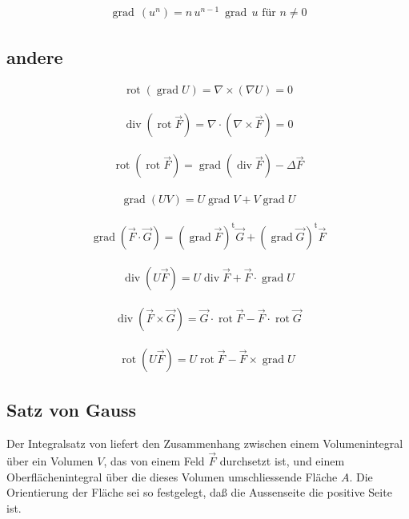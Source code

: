 \documentclass[a4paper]{scrartcl}
\begin{document}
\begin{align}
\label{eqn:ProduktregelEinesGradientMitPotenzen}
\operatorname{grad}\,(u^n) = n\, u^{n-1}\ \operatorname{grad}\,u \text{ für } n\neq 0
\end{align}


\subsection{andere}
\begin{align}
\operatorname{rot}(\operatorname{grad}U)=\nabla \times (\nabla U) = 0
\end{align}

\begin{align}
\operatorname{div}(\operatorname{rot}\vec{F}) = \nabla \cdot (\nabla \times
\vec F) = 0
\end{align}

\begin{align}
\operatorname{rot}(\operatorname{rot}\vec{F}) =
\operatorname{grad}(\operatorname{div}\vec{F}) -\Delta \vec{F}
\end{align}

\begin{align}
\operatorname{grad}(UV)=U\operatorname{grad}V+V\operatorname{grad}U
\end{align}

\begin{align}
\operatorname{grad}(\vec{F}\cdot \vec{G}) =
(\operatorname{grad}\vec{F})^{\operatorname t}\vec{G} + (\operatorname{grad}\vec{G})^{\operatorname t}\vec{F}
\end{align}

\begin{align}
\operatorname{div}(U\vec{F})=U\operatorname{div}\vec{F}+
\vec{F}\cdot\operatorname{grad}U
\end{align}

\begin{align}
\operatorname{div}(\vec{F}\times \vec{G})= \vec{G} \cdot
\operatorname{rot}\vec{F} -\vec{F}\cdot\operatorname{rot}\vec{G}
\end{align}

\begin{align}
\operatorname{rot}(U\vec{F})= U\operatorname{rot}\vec{F}
-\vec{F}\times\operatorname{grad}U\
\end{align}
\subsection{Satz von Gauss}
Der Integralsatz von  liefert den Zusammenhang zwischen einem Volumenintegral
über ein Volumen $V$, das von einem Feld $\vec F$ durchsetzt ist, und einem
Oberflächenintegral über die dieses Volumen umschliessende Fläche $A$. Die
Orientierung der Fläche sei so festgelegt, daß die Aussenseite die positive
Seite ist.
\end{document}
